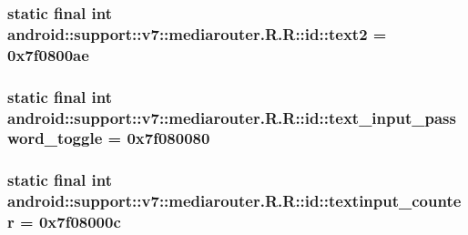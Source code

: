 \hypertarget{classandroid_1_1support_1_1v7_1_1mediarouter_1_1_r_1_1id_62ef947334d71d3723b98e5652193971}{
\subsubsection[{text2}]{\setlength{\rightskip}{0pt plus 5cm}static final int android::support::v7::mediarouter.R.R::id::text2 = 0x7f0800ae}}
\label{classandroid_1_1support_1_1v7_1_1mediarouter_1_1_r_1_1id_62ef947334d71d3723b98e5652193971}


\hypertarget{classandroid_1_1support_1_1v7_1_1mediarouter_1_1_r_1_1id_bcbda5eeb71aff782d9b2b06af2b4b94}{
\subsubsection[{text\_\-input\_\-password\_\-toggle}]{\setlength{\rightskip}{0pt plus 5cm}static final int android::support::v7::mediarouter.R.R::id::text\_\-input\_\-password\_\-toggle = 0x7f080080}}
\label{classandroid_1_1support_1_1v7_1_1mediarouter_1_1_r_1_1id_bcbda5eeb71aff782d9b2b06af2b4b94}


\hypertarget{classandroid_1_1support_1_1v7_1_1mediarouter_1_1_r_1_1id_16269b185e2dc417fed58bd0955ba196}{
\subsubsection[{textinput\_\-counter}]{\setlength{\rightskip}{0pt plus 5cm}static final int android::support::v7::mediarouter.R.R::id::textinput\_\-counter = 0x7f08000c}}
\label{classandroid_1_1support_1_1v7_1_1mediarouter_1_1_r_1_1id_16269b185e2dc417fed58bd0955ba196}


